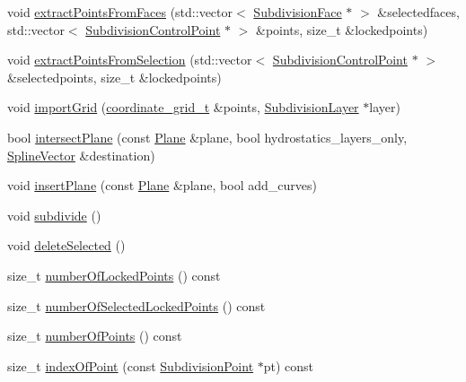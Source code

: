 \begin{DoxyCompactItemize}
\item 
void \hyperlink{classShipCAD_1_1SubdivisionSurface_af62ba549d058dfddd4bfa1b69a577220}{extract\+Points\+From\+Faces} (std\+::vector$<$ \hyperlink{classShipCAD_1_1SubdivisionFace}{Subdivision\+Face} $\ast$ $>$ \&selectedfaces, std\+::vector$<$ \hyperlink{classShipCAD_1_1SubdivisionControlPoint}{Subdivision\+Control\+Point} $\ast$ $>$ \&points, size\+\_\+t \&lockedpoints)
\item 
void \hyperlink{classShipCAD_1_1SubdivisionSurface_af0f0d7bb979c8c8ba04b9be26e7cfe30}{extract\+Points\+From\+Selection} (std\+::vector$<$ \hyperlink{classShipCAD_1_1SubdivisionControlPoint}{Subdivision\+Control\+Point} $\ast$ $>$ \&selectedpoints, size\+\_\+t \&lockedpoints)
\item 
void \hyperlink{classShipCAD_1_1SubdivisionSurface_aa193fd28425e9846908479615e7c5bf9}{import\+Grid} (\hyperlink{classShipCAD_1_1SubdivisionSurface_a8ed657cb7d4cd34662bd2d3e949d3e3b}{coordinate\+\_\+grid\+\_\+t} \&points, \hyperlink{classShipCAD_1_1SubdivisionLayer}{Subdivision\+Layer} $\ast$layer)
\item 
bool \hyperlink{classShipCAD_1_1SubdivisionSurface_a86961ff2a6421d778814c013c3d2b8d7}{intersect\+Plane} (const \hyperlink{classShipCAD_1_1Plane}{Plane} \&plane, bool hydrostatics\+\_\+layers\+\_\+only, \hyperlink{namespaceShipCAD_a053b941b2c87049bb9380428d4d5a056}{Spline\+Vector} \&destination)
\item 
void \hyperlink{classShipCAD_1_1SubdivisionSurface_ada26b740ea1f317763b6ecd372f13ea2}{insert\+Plane} (const \hyperlink{classShipCAD_1_1Plane}{Plane} \&plane, bool add\+\_\+curves)
\item 
void \hyperlink{classShipCAD_1_1SubdivisionSurface_ad9970c667fa8e33ff8b35eb6a48b6a2e}{subdivide} ()
\item 
void \hyperlink{classShipCAD_1_1SubdivisionSurface_a362b063921c6441d8e91935226062ed5}{delete\+Selected} ()
\item 
size\+\_\+t \hyperlink{classShipCAD_1_1SubdivisionSurface_aeb28d59329d4efaa4db5f225eed4ec45}{number\+Of\+Locked\+Points} () const 
\item 
size\+\_\+t \hyperlink{classShipCAD_1_1SubdivisionSurface_add27457b6d8b5e3479c34dbb0124c606}{number\+Of\+Selected\+Locked\+Points} () const 
\item 
size\+\_\+t \hyperlink{classShipCAD_1_1SubdivisionSurface_a601a3e5ad3d65907079afc488dc5fa47}{number\+Of\+Points} () const 
\item 
size\+\_\+t \hyperlink{classShipCAD_1_1SubdivisionSurface_ae7e58fab790876b4d1108f7e7d7c65a6}{index\+Of\+Point} (const \hyperlink{classShipCAD_1_1SubdivisionPoint}{Subdivision\+Point} $\ast$pt) const 

\end{DoxyCompactItemize}
